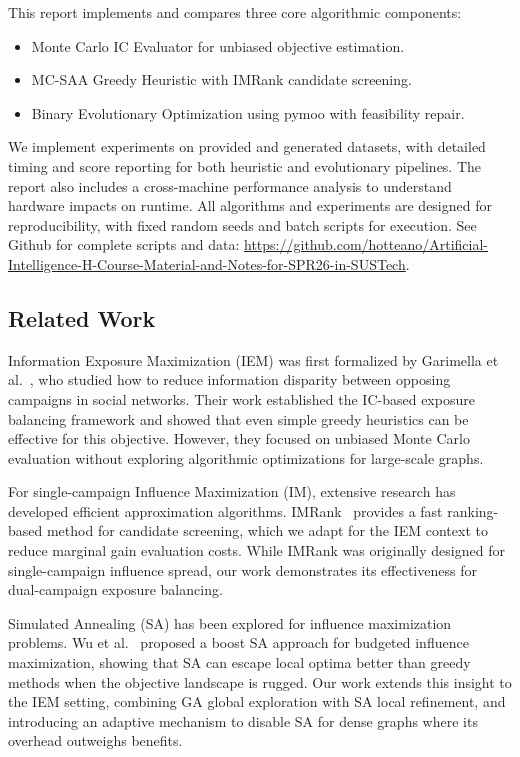 \documentclass[onecolumn,a4paper,12pt]{IEEEtran}
\begin{document}
This report implements and compares three core algorithmic components:
\begin{itemize}
        \item Monte Carlo IC Evaluator for unbiased objective estimation.
        \item MC-SAA Greedy Heuristic with IMRank candidate screening.
        \item Binary Evolutionary Optimization using pymoo with feasibility repair.
\end{itemize}

We implement experiments on provided and generated datasets, with detailed timing and score reporting for both heuristic and evolutionary pipelines. The report also includes a cross-machine performance analysis to understand hardware impacts on runtime. All algorithms and experiments are designed for reproducibility, with fixed random seeds and batch scripts for execution. See Github for complete scripts and data: \url{https://github.com/hotteano/Artificial-Intelligence-H-Course-Material-and-Notes-for-SPR26-in-SUSTech}.

\subsection{Related Work}

Information Exposure Maximization (IEM) was first formalized by Garimella et al.~\cite{garimella2018balancinginformationexposuresocial}, who studied how to reduce information disparity between opposing campaigns in social networks. Their work established the IC-based exposure balancing framework and showed that even simple greedy heuristics can be effective for this objective. However, they focused on unbiased Monte Carlo evaluation without exploring algorithmic optimizations for large-scale graphs.

For single-campaign Influence Maximization (IM), extensive research has developed efficient approximation algorithms. IMRank~\cite{cheng2014imrankinfluencemaximizationfinding} provides a fast ranking-based method for candidate screening, which we adapt for the IEM context to reduce marginal gain evaluation costs. While IMRank was originally designed for single-campaign influence spread, our work demonstrates its effectiveness for dual-campaign exposure balancing.

Simulated Annealing (SA) has been explored for influence maximization problems. Wu et al.~\cite{wu2022budgetedinfluencemaximizationboost} proposed a boost SA approach for budgeted influence maximization, showing that SA can escape local optima better than greedy methods when the objective landscape is rugged. Our work extends this insight to the IEM setting, combining GA global exploration with SA local refinement, and introducing an adaptive mechanism to disable SA for dense graphs where its overhead outweighs benefits.
\end{document}

